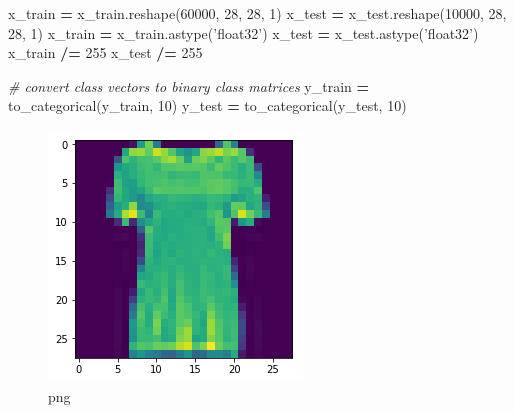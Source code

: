 \documentclass[]{book}
\newenvironment{Shaded}{\begin{snugshade}}{\end{snugshade}}
\newcommand{\DecValTok}[1]{\textcolor[rgb]{0.00,0.00,0.81}{#1}}
\newcommand{\StringTok}[1]{\textcolor[rgb]{0.31,0.60,0.02}{#1}}
\newcommand{\ImportTok}[1]{#1}
\newcommand{\CommentTok}[1]{\textcolor[rgb]{0.56,0.35,0.01}{\textit{#1}}}
\newcommand{\OperatorTok}[1]{\textcolor[rgb]{0.81,0.36,0.00}{\textbf{#1}}}
\newcommand{\NormalTok}[1]{#1}
\theoremstyle{definition}
\theoremstyle{definition}
\theoremstyle{definition}
\theoremstyle{remark}
\begin{document}
\begin{Shaded}
\begin{Highlighting}[]
\NormalTok{x_train }\OperatorTok{=}\NormalTok{ x_train.reshape(}\DecValTok{60000}\NormalTok{, }\DecValTok{28}\NormalTok{, }\DecValTok{28}\NormalTok{, }\DecValTok{1}\NormalTok{)}
\NormalTok{x_test }\OperatorTok{=}\NormalTok{ x_test.reshape(}\DecValTok{10000}\NormalTok{, }\DecValTok{28}\NormalTok{, }\DecValTok{28}\NormalTok{, }\DecValTok{1}\NormalTok{)}
\NormalTok{x_train }\OperatorTok{=}\NormalTok{ x_train.astype(}\StringTok{'float32'}\NormalTok{)}
\NormalTok{x_test }\OperatorTok{=}\NormalTok{ x_test.astype(}\StringTok{'float32'}\NormalTok{)}
\NormalTok{x_train }\OperatorTok{/=} \DecValTok{255}
\NormalTok{x_test }\OperatorTok{/=} \DecValTok{255}

\CommentTok{# convert class vectors to binary class matrices}
\NormalTok{y_train }\OperatorTok{=}\NormalTok{ to_categorical(y_train, }\DecValTok{10}\NormalTok{)}
\NormalTok{y_test }\OperatorTok{=}\NormalTok{ to_categorical(y_test, }\DecValTok{10}\NormalTok{)}
\end{Highlighting}
\end{Shaded}

\begin{Shaded}
\end{Shaded}

\begin{figure}
\centering
\includegraphics{output_5_0.png}
\caption{png}
\end{figure}
\end{document}
